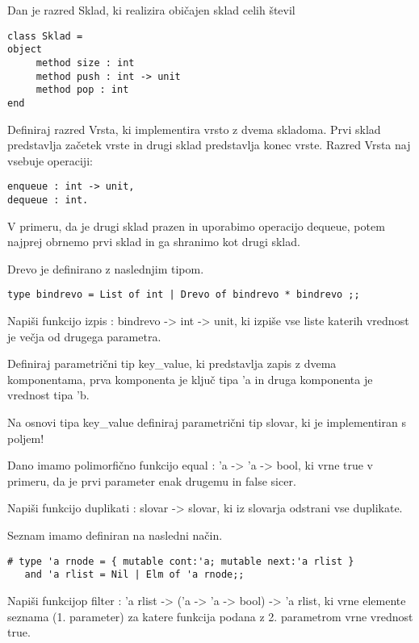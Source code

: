 \begin{ex}
\end{ex} \begin{ex}
Dan je razred Sklad, ki realizira obi\v cajen sklad celih \v stevil

\begin{verbatim}
class Sklad =
object 
     method size : int
     method push : int -> unit
     method pop : int
end

\end{verbatim}
Definiraj razred Vrsta, ki implementira vrsto z dvema skladoma. Prvi sklad predstavlja za\v cetek vrste in drugi sklad predstavlja konec vrste. Razred Vrsta naj vsebuje operaciji: 

\begin{verbatim}
enqueue : int -> unit, 
dequeue : int. 

\end{verbatim}
V primeru, da je drugi sklad prazen in uporabimo operacijo dequeue, potem najprej obrnemo prvi sklad in ga shranimo kot drugi sklad.



\end{ex} \begin{ex}
Drevo je definirano z naslednjim tipom. 

\begin{verbatim}
type bindrevo = List of int | Drevo of bindrevo * bindrevo ;; 
\end{verbatim}

Napi\v si funkcijo izpis : bindrevo -> int -> unit, ki izpi\v se vse liste katerih vrednost je ve\v cja od drugega parametra. 


\end{ex} \begin{ex}
Definiraj parametri\v cni tip key\_value, ki predstavlja zapis z dvema komponentama, prva komponenta je klju\v c tipa 'a in druga komponenta je vrednost tipa 'b. 

Na osnovi tipa key\_value definiraj parametri\v cni tip slovar, ki je implementiran s poljem! 

Dano imamo polimorfi\v cno funkcijo equal : 'a -> 'a -> bool, ki vrne true v primeru, da je prvi parameter enak drugemu in false sicer. 

Napi\v si funkcijo duplikati : slovar -> slovar, ki iz slovarja odstrani vse duplikate. 


\end{ex} \begin{ex}
Seznam imamo definiran na nasledni na\v cin. 
\begin{verbatim}
# type 'a rnode = { mutable cont:'a; mutable next:'a rlist } 
   and 'a rlist = Nil | Elm of 'a rnode;; 
\end{verbatim}
Napi\v si funkcijop filter : 'a rlist -> ('a -> 'a -> bool) -> 'a rlist, ki vrne elemente seznama (1. parameter) za katere funkcija podana z 2. parametrom vrne vrednost true.


\end{ex}
